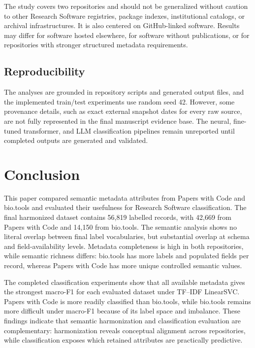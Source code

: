 \documentclass[pdflatex,sn-mathphys-num]{sn-jnl}%
\theoremstyle{thmstyleone}%
\theoremstyle{thmstyletwo}%
\theoremstyle{thmstylethree}%
\begin{document}
The study covers two repositories and should not be generalized without caution to other Research Software registries, package indexes, institutional catalogs, or archival infrastructures. It is also centered on GitHub-linked software. Results may differ for software hosted elsewhere, for software without publications, or for repositories with stronger structured metadata requirements.

\subsection{Reproducibility}
\label{subsec:threats-reproducibility}

The analyses are grounded in repository scripts and generated output files, and the implemented train/test experiments use random seed 42. However, some provenance details, such as exact external snapshot dates for every raw source, are not fully represented in the final manuscript evidence base. The neural, fine-tuned transformer, and LLM classification pipelines remain unreported until completed outputs are generated and validated.

\section{Conclusion}
\label{sec:conclusion}

This paper compared semantic metadata attributes from Papers with Code and bio.tools and evaluated their usefulness for Research Software classification. The final harmonized dataset contains 56,819 labelled records, with 42,669 from Papers with Code and 14,150 from bio.tools. The semantic analysis shows no literal overlap between final label vocabularies, but substantial overlap at schema and field-availability levels. Metadata completeness is high in both repositories, while semantic richness differs: bio.tools has more labels and populated fields per record, whereas Papers with Code has more unique controlled semantic values.

The completed classification experiments show that all available metadata gives the strongest macro-F1 for each evaluated dataset under TF--IDF LinearSVC. Papers with Code is more readily classified than bio.tools, while bio.tools remains more difficult under macro-F1 because of its label space and imbalance. These findings indicate that semantic harmonization and classification evaluation are complementary: harmonization reveals conceptual alignment across repositories, while classification exposes which retained attributes are practically predictive.
\end{document}
